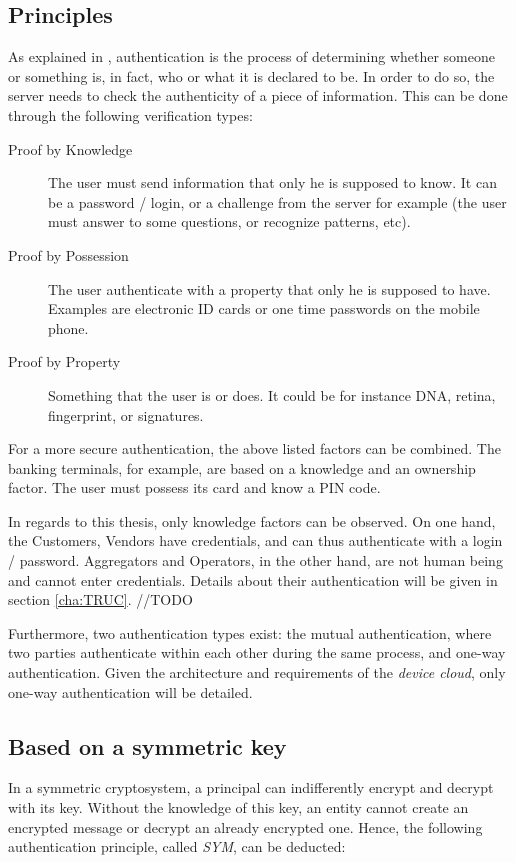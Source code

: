 \subsection{Principles}
As explained in \cite{patel2008information}, authentication is the process of determining whether someone or something is, in fact, who or what it is declared to be.	In order to do so, the server needs to check the authenticity of a piece of information. This can be done through the following verification types:

\begin{description}
	\item[Proof by Knowledge] The user must send information that only he is supposed to know. It can be a password / login, or a challenge from the server for example (the user must answer to some questions, or recognize patterns, etc).
	\item[Proof by Possession] The user authenticate with a property that only he is supposed to have. Examples are electronic ID cards or one time passwords on the mobile phone.
	\item[Proof by Property] Something that the user is or does. It could be for instance DNA, retina, fingerprint, or signatures. 
\end{description}

For a more secure authentication, the above listed factors can be combined. The banking terminals, for example, are based on a knowledge and an ownership factor. The user must possess its card and know a PIN code.

In regards to this thesis, only knowledge factors can be observed. On one hand, the Customers, Vendors have credentials, and can thus authenticate with a login / password. Aggregators and Operators, in the other hand, are not human being and cannot enter credentials. Details about their authentication will be given in section \ref{cha:TRUC}. //TODO

Furthermore, two authentication types exist: the mutual authentication, where two parties authenticate within each other during the same process, and one-way authentication. Given the architecture and requirements of the \emph{device cloud}, only one-way authentication will be detailed. 

\subsection{Based on a symmetric key}
In a symmetric cryptosystem, a principal can indifferently encrypt and decrypt with its key. Without the knowledge of this key, an entity cannot create an encrypted message or decrypt an already encrypted one. Hence, the following authentication principle, called \emph{SYM}, can be deducted:

